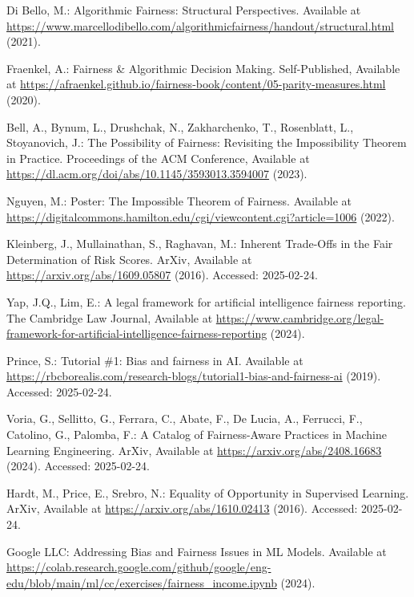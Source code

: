 \documentclass[runningheads]{llncs}
\begin{document}
\begin{thebibliography}{8}
Di Bello, M.: Algorithmic Fairness: Structural Perspectives. Available at \url{https://www.marcellodibello.com/algorithmicfairness/handout/structural.html} (2021).

Fraenkel, A.: Fairness \& Algorithmic Decision Making. Self-Published, Available at \url{https://afraenkel.github.io/fairness-book/content/05-parity-measures.html} (2020).

Bell, A., Bynum, L., Drushchak, N., Zakharchenko, T., Rosenblatt, L., Stoyanovich, J.: The Possibility of Fairness: Revisiting the Impossibility Theorem in Practice. Proceedings of the ACM Conference, Available at \url{https://dl.acm.org/doi/abs/10.1145/3593013.3594007} (2023).

Nguyen, M.: Poster: The Impossible Theorem of Fairness. Available at \url{https://digitalcommons.hamilton.edu/cgi/viewcontent.cgi?article=1006} (2022).

Kleinberg, J., Mullainathan, S., Raghavan, M.: Inherent Trade-Offs in the Fair Determination of Risk Scores. ArXiv, Available at \url{https://arxiv.org/abs/1609.05807} (2016). Accessed: 2025-02-24.

Yap, J.Q., Lim, E.: A legal framework for artificial intelligence fairness reporting. The Cambridge Law Journal, Available at \url{https://www.cambridge.org/legal-framework-for-artificial-intelligence-fairness-reporting} (2024).

Prince, S.: Tutorial \#1: Bias and fairness in AI. Available at \url{https://rbcborealis.com/research-blogs/tutorial1-bias-and-fairness-ai} (2019). Accessed: 2025-02-24.

Voria, G., Sellitto, G., Ferrara, C., Abate, F., De Lucia, A., Ferrucci, F., Catolino, G., Palomba, F.: A Catalog of Fairness-Aware Practices in Machine Learning Engineering. ArXiv, Available at \url{https://arxiv.org/abs/2408.16683} (2024). Accessed: 2025-02-24.

Hardt, M., Price, E., Srebro, N.: Equality of Opportunity in Supervised Learning. ArXiv, Available at \url{https://arxiv.org/abs/1610.02413} (2016). Accessed: 2025-02-24.

Google LLC: Addressing Bias and Fairness Issues in ML Models. Available at \url{https://colab.research.google.com/github/google/eng-edu/blob/main/ml/cc/exercises/fairness_income.ipynb} (2024).


\end{thebibliography}
\end{document}
